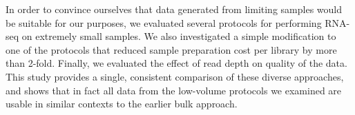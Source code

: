 In order to convince ourselves that data generated from limiting samples would be suitable for our purposes, we evaluated several protocols for performing RNA-seq on extremely small samples.  We also investigated a simple modification to one of the protocols that reduced sample preparation cost per library by more than 2-fold.  Finally, we evaluated the effect of read depth on quality of the data.  This study provides a single, consistent comparison of these diverse approaches, and shows that in fact all data from the low-volume protocols we examined are usable in similar contexts to the earlier bulk approach.

